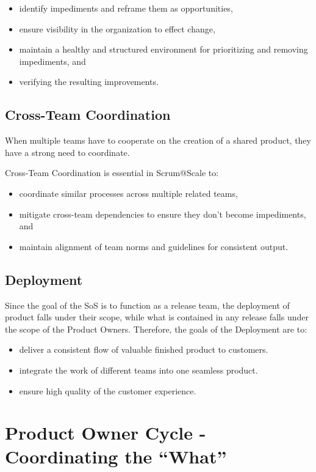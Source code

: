 \documentclass[12pt,a4paper,parskip=full]{scrartcl}
\begin{document}
\begin{itemize}
	\item identify impediments and reframe them as opportunities,
	\item ensure visibility in the organization to effect change,
	\item maintain a healthy and structured environment for prioritizing and removing impediments, and 
	\item verifying the resulting improvements.
\end{itemize}

\subsection{Cross-Team Coordination}

When multiple teams have to cooperate on the creation of a shared product,
they have a strong need to coordinate.

Cross-Team Coordination is essential in Scrum@Scale to:

\begin{itemize}
	\item coordinate similar processes across multiple related teams,
	\item mitigate cross-team dependencies to ensure they don't become impediments, and 
	\item maintain alignment of team norms and guidelines for consistent output.
\end{itemize}

\subsection{Deployment}

Since the goal of the SoS is to function as a release team, the deployment of product falls under their scope, while what is contained in any release falls under the scope of the Product Owners. Therefore, the goals of the Deployment are to:

\begin{itemize}
	\item deliver a consistent flow of valuable finished product to customers.
	\item integrate the work of different teams into one seamless product.
	\item ensure high quality of the customer experience.
\end{itemize}

\section{Product Owner Cycle - Coordinating the ``What''}
\end{document}
